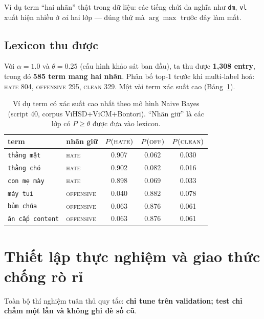 \documentclass[11pt,a4paper]{article}
\newcommand{\code}[1]{\texttt{\small #1}}
\begin{document}
Ví dụ term ``hai nhãn'' thật trong dữ liệu: các tiếng chửi đa nghĩa như
\code{dm}, \code{vl} xuất hiện nhiều ở \emph{cả} hai lớp --- đúng thứ mà
$\arg\max$ trước đây làm mất.

\subsection{Lexicon thu được}
Với $\alpha=1.0$ và $\theta=0.25$ (cấu hình khảo sát ban đầu), ta thu được
\textbf{1{,}308 entry}, trong đó \textbf{585 term mang hai nhãn}.  Phân bố top-1
trước khi multi-label hoá: \textsc{hate} 804, \textsc{offensive} 295,
\textsc{clean} 329.  Một vài term xác suất cao (Bảng~\ref{tab:terms}).

\begin{table}[H]
  \centering
  \small
  \caption{Ví dụ term có xác suất cao nhất theo mô hình Naive Bayes
  (script 40, corpus ViHSD+ViCM+Bontori).  ``Nhãn giữ'' là các lớp có
  $P\ge\theta$ được đưa vào lexicon.}
  \label{tab:terms}
  \begin{tabular}{llccc}
    \toprule
    term & nhãn giữ & $P(\textsc{hate})$ & $P(\textsc{off})$ & $P(\textsc{clean})$ \\
    \midrule
    \code{thằng mặt}      & \textsc{hate}              & 0.907 & 0.062 & 0.030 \\
    \code{thằng chó}      & \textsc{hate}              & 0.902 & 0.082 & 0.016 \\
    \code{con mẹ mày}     & \textsc{hate}              & 0.898 & 0.069 & 0.033 \\
    \code{máy tui}        & \textsc{offensive}         & 0.040 & 0.882 & 0.078 \\
    \code{bủm chúa}       & \textsc{offensive}         & 0.063 & 0.876 & 0.061 \\
    \code{ăn cắp content} & \textsc{offensive}         & 0.063 & 0.876 & 0.061 \\
    \bottomrule
  \end{tabular}
\end{table}

\section{Thiết lập thực nghiệm và giao thức chống rò rỉ}
\label{sec:protocol}

Toàn bộ thí nghiệm tuân thủ quy tắc: \textbf{chỉ tune trên validation; test chỉ
chấm một lần và không ghi đè số cũ}.
\end{document}
